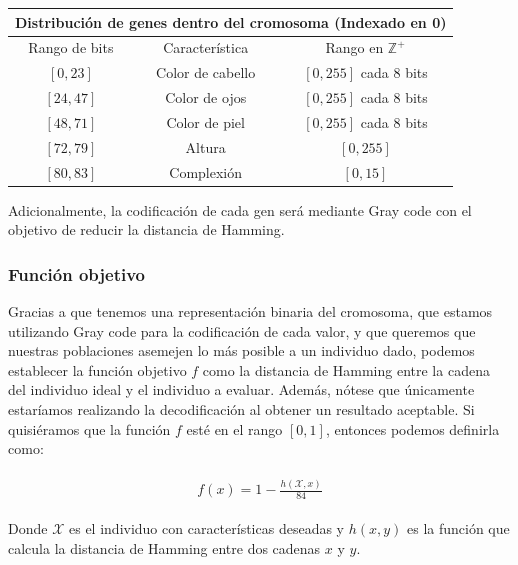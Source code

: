 \documentclass[10pt,letterpaper]{article}
\begin{document}
\begin{center} \begin{tabular}{ |c|c|c| }
    \hline
    \multicolumn{3}{|c|}{Distribución de genes dentro del cromosoma \scriptsize{(Indexado en 0)}} \\
    \hline
    Rango de bits & Característica & Rango en $\mathbb{Z}^+$\\
    \hline
    $[0, 23]$   & Color de cabello & $[0, 255]$ cada 8 bits \\
    $[24, 47]$  & Color de ojos & $[0, 255]$ cada 8 bits \\
    $[48, 71]$   & Color de piel & $[0, 255]$ cada 8 bits \\
    $[72, 79]$   & Altura & $[0, 255]$ \\
    $[80, 83]$   & Complexión & $[0, 15]$ \\
    \hline
\end{tabular} \end{center}

Adicionalmente, la codificación de cada gen será mediante Gray code con el objetivo de
reducir la distancia de Hamming.

\subsubsection{Función objetivo}

Gracias a que tenemos una representación binaria del cromosoma, que estamos utilizando
Gray code para la codificación de cada valor, y que queremos que nuestras poblaciones
asemejen lo más posible a un individuo dado, podemos establecer la función objetivo $f$
como la distancia de Hamming entre la cadena del individuo ideal y el individuo a evaluar.
Además, nótese que únicamente estaríamos realizando la decodificación al obtener un resultado aceptable.
Si quisiéramos que la función $f$ esté en el rango $[0, 1]$, entonces podemos definirla
como:

\begin{equation*} \begin{split} \begin{gathered}
    f(x) = 1 - \frac{h(\mathcal{X}, x)}{84}
\end{gathered} \end{split} \end{equation*}

Donde $\mathcal{X}$ es el individuo con características deseadas y $h(x, y)$ es la
función que calcula la distancia de Hamming entre dos cadenas $x$ y $y$.
\end{document}
